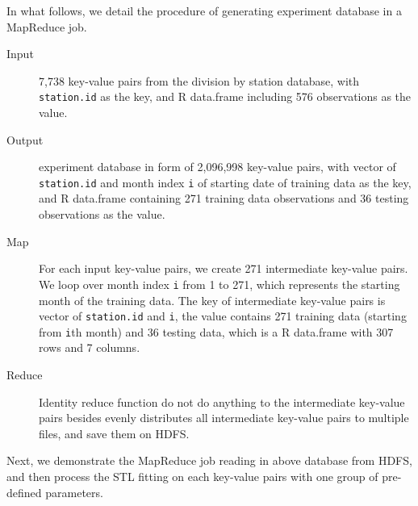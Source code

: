 In what follows, we detail the procedure of generating experiment database in a 
MapReduce job.

\begin{description}
  \item[Input] 7,738 key-value pairs from the division by station database, with 
  \texttt{station.id} as the key, and R data.frame including 576 observations as
  the value.
  \item[Output] experiment database in form of 2,096,998 key-value pairs, with 
  vector of \texttt{station.id} and month index \texttt{i} of starting date of 
  training data as the key, and R data.frame containing 271 training data 
  observations and 36 testing observations as the value.
  \item[Map] For each input key-value pairs, we create 271 intermediate key-value
  pairs. We loop over month index \texttt{i} from 1 to 271, which represents the
  starting month of the training data. The key of intermediate key-value pairs
  is vector of \texttt{station.id} and \texttt{i}, the value contains 271 
  training data (starting from \texttt{i}th month) and 36 testing data, which is 
  a R data.frame with 307 rows and 7 columns.
  \item[Reduce] Identity reduce function do not do anything to the intermediate 
  key-value pairs besides evenly distributes all intermediate key-value pairs to 
  multiple files, and save them on HDFS.
\end{description} 

Next, we demonstrate the MapReduce job reading in above database from HDFS, and 
then process the STL fitting on each key-value pairs with one group of pre-defined 
parameters. 

